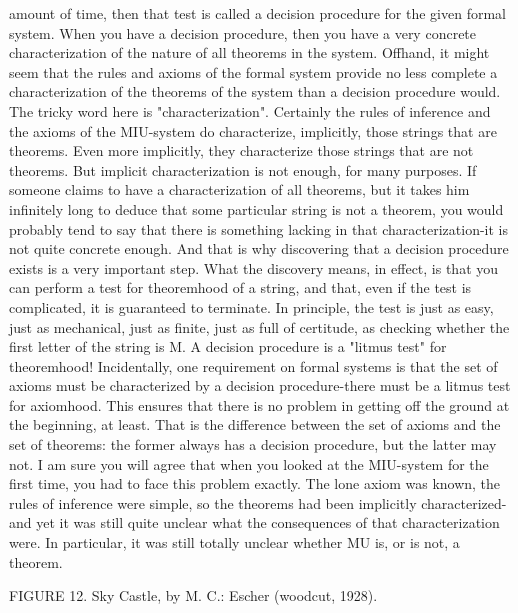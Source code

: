 amount of time, then that test is called a decision procedure for the given formal system. When you have a decision procedure, then you have a very concrete characterization of the nature of all theorems in the system. Offhand, it might seem that the rules and axioms of the formal system provide no less complete a characterization of the theorems of the system than a decision procedure would. The tricky word here is "characterization". Certainly the rules of inference and the axioms of the MIU-system do characterize, implicitly, those strings that are theorems. Even more implicitly, they characterize those strings that are not theorems. But implicit characterization is not enough, for many purposes. If someone claims to have a characterization of all theorems, but it takes him infinitely long to deduce that some particular string is not a theorem, you would probably tend to say that there is something lacking in that characterization-it is not quite concrete enough. And that is why discovering that a decision procedure exists is a very important step. What the discovery means, in effect, is that you can perform a test for theoremhood of a string, and that, even if the test is complicated, it is guaranteed to terminate. In principle, the test is just as easy, just as mechanical, just as finite, just as full of certitude, as checking whether the first letter of the string is M. A decision procedure is a "litmus test" for theoremhood! Incidentally, one requirement on formal systems is that the set of axioms must be characterized by a decision procedure-there must be a litmus test for axiomhood. This ensures that there is no problem in getting off the ground at the beginning, at least. That is the difference between the set of axioms and the set of theorems: the former always has a decision procedure, but the latter may not. I am sure you will agree that when you looked at the MIU-system for the first time, you had to face this problem exactly. The lone axiom was known, the rules of inference were simple, so the theorems had been implicitly characterized-and yet it was still quite unclear what the consequences of that characterization were. In particular, it was still totally unclear whether MU is, or is not, a theorem. 







FIGURE 12. Sky Castle, by M. C.: Escher (woodcut, 1928). 







